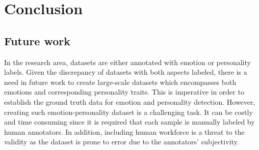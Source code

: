 \chapter{Conclusion}

\section{Future work}
In the research area, datasets are either annotated with emotion or personality labels. Given the discrepancy of datasets with both aspects labeled, there is a need in future work to create large-scale datasets which encompasses both emotions and corresponding personality traits. This is imperative in order to establish the ground truth data for emotion and personality detection. However, creating such emotion-personality dataset is a challenging task. It can be costly and time consuming since it is required that each sample is manually labeled by human annotators. In addition, including human workforce is a threat to the validity as the dataset is prone to error due to the annotators' subjectivity. 
